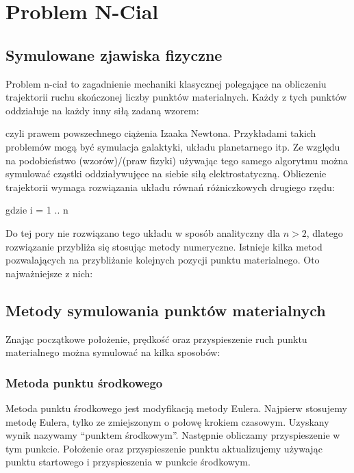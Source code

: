 
\section { Problem N-Cial }
\subsection {Symulowane zjawiska fizyczne}
Problem n-ciał to zagadnienie mechaniki klasycznej polegające na obliczeniu trajektorii ruchu skończonej liczby punktów materialnych. 
Każdy z tych punktów oddziałuje na każdy inny siłą zadaną wzorem:

\begin{center}
 
\end{center}

czyli prawem powszechnego ciążenia Izaaka Newtona.\linebreak
Przykładami takich problemów mogą być symulacja galaktyki, układu planetarnego itp.
Ze względu na podobieństwo (wzorów)/(praw fizyki) używając tego samego algorytmu można symulować cząstki oddziaływujęce na siebie siłą elektrostatyczną.\linebreak
Obliczenie trajektorii wymaga rozwiązania układu równań różniczkowych drugiego rzędu:
\begin{center}
 gdzie i = 1 .. n 
\end{center}


Do tej pory nie rozwiązano tego układu w sposób analityczny dla $n > 2$, dlatego rozwiązanie przybliża się stosując metody numeryczne. Istnieje kilka metod pozwalających na przybliżanie kolejnych pozycji punktu materialnego. Oto najważniejsze z nich:

\subsection {Metody symulowania punktów materialnych}

Znając początkowe położenie, prędkość oraz przyspieszenie ruch punktu materialnego można symulować na kilka sposobów:


\subsubsection {Metoda punktu środkowego}
Metoda punktu środkowego jest modyfikacją metody Eulera. Najpierw stosujemy metodę Eulera, tylko ze zmiejszonym o połowę krokiem czasowym. Uzyskany wynik nazywamy ``punktem środkowym''. Następnie obliczamy przyspieszenie w tym punkcie. Położenie oraz przyspieszenie punktu aktualizujemy używając punktu startowego i przyspieszenia w punkcie środkowym.

